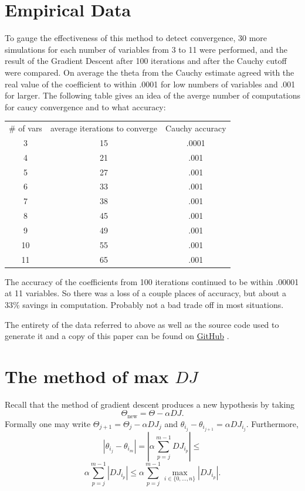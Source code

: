 \documentclass[11pt]{article} %
\begin{document}
\section{Empirical Data}
To gauge the effectiveness of this method to detect convergence, 30 more simulations for each number of variables from 3 to 11 were performed, and the result of the Gradient Descent after 100 iterations and after the Cauchy cutoff were compared. On average the theta from the Cauchy estimate agreed with the real value of the coefficient to within .0001 for low numbers of variables and .001 for larger.  The following table gives an idea of the averge number of computations for caucy convergence and to what accuracy: 

\begin{tabular} {ccc}
\# of vars & average iterations to converge & Cauchy accuracy\\
3 &  15 & .0001 \\
4 &  21  & .001 \\
5 &  27 & .001 \\
6 &  33 & .001 \\
7 &  38 & .001 \\
8 & 45 & .001 \\
9 & 49 & .001\\
10 & 55 & .001\\
11 & 65 & .001

\end{tabular} 

The accuracy of the coefficients from 100 iterations continued to be within .00001 at 11 variables.  So there was a loss of a couple places of accuracy, but about a 33\% savings in computation.  Probably not a bad trade off in most situations.  

The entirety of the data referred to above as well as the source code used to generate it and a copy of this paper can be found on \href{ https://github.com/likes2addfunctions/CodeSamples/tree/master/GDCauchyMethod }{ GitHub} .

\section{The method of max $DJ$}
Recall that the method of gradient descent produces a new hypothesis by taking 
$$\Theta_{\mbox{new}} = \Theta - \alpha DJ.$$
Formally one may write 
$\Theta_{j+1} = \Theta_{j} - \alpha DJ_{j}$ 
and $\theta_{i_{j}} - \theta_{i_{j+1}} = \alpha DJ_{i_{j}}$. 
 Furthermore,
$$|\theta_{i_{j}} - \theta_{i_{m}}| = | \alpha \sum_{p=j}^{m-1}  DJ_{i_{p}}| \leq$$
$$\alpha \sum_{p=j}^{m-1}  |DJ_{i_{p}}| \leq \alpha \sum_{p=j}^{m-1} \max_{i \in \{0, \dots , n\}} |DJ_{i_{p}}|. $$
\end{document}
